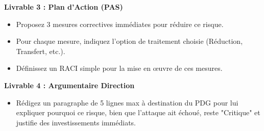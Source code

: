 \textbf{Livrable 3 : Plan d'Action (PAS)}
\begin{itemize}
    \item Proposez 3 mesures correctives immédiates pour réduire ce risque.
    \item Pour chaque mesure, indiquez l'option de traitement choisie (Réduction, Transfert, etc.).
    \item Définissez un RACI simple pour la mise en œuvre de ces mesures.
\end{itemize}

\textbf{Livrable 4 : Argumentaire Direction}
\begin{itemize}
    \item Rédigez un paragraphe de 5 lignes max à destination du PDG pour lui expliquer pourquoi ce risque, bien que l'attaque ait échoué, reste "Critique" et justifie des investissements immédiats.
\end{itemize}

